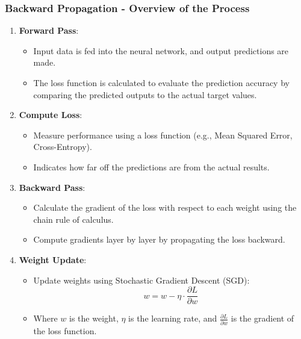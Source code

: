 \documentclass[aspectratio=169]{beamer}
\begin{document}
\begin{frame}[fragile]
    \frametitle{Backward Propagation - Overview of the Process}
    \begin{enumerate}
        \item \textbf{Forward Pass}:
        \begin{itemize}
            \item Input data is fed into the neural network, and output predictions are made.
            \item The loss function is calculated to evaluate the prediction accuracy by comparing the predicted outputs to the actual target values.
        \end{itemize}
    
        \item \textbf{Compute Loss}:
        \begin{itemize}
            \item Measure performance using a loss function (e.g., Mean Squared Error, Cross-Entropy).
            \item Indicates how far off the predictions are from the actual results.
        \end{itemize}
    
        \item \textbf{Backward Pass}:
        \begin{itemize}
            \item Calculate the gradient of the loss with respect to each weight using the chain rule of calculus.
            \item Compute gradients layer by layer by propagating the loss backward.
        \end{itemize}
    
        \item \textbf{Weight Update}:
        \begin{itemize}
            \item Update weights using Stochastic Gradient Descent (SGD):
            \begin{equation}
                w = w - \eta \cdot \frac{\partial L}{\partial w}
            \end{equation}
            \item Where \( w \) is the weight, \( \eta \) is the learning rate, and \( \frac{\partial L}{\partial w} \) is the gradient of the loss function.
        \end{itemize}
    \end{enumerate}
\end{frame}
\end{document}
